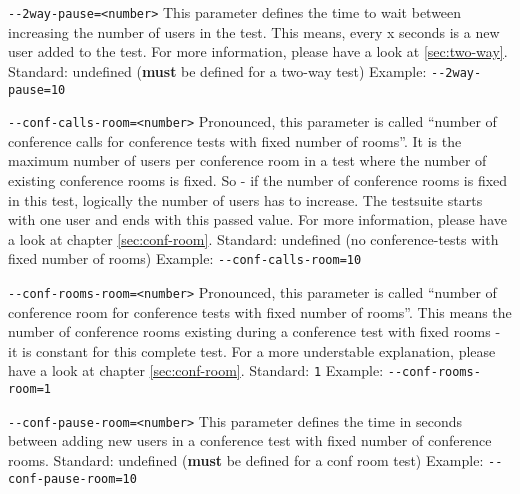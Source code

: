 \begin{description}
\item {\texttt{-{}-2way-pause=<number>}} \newline
This parameter defines the time to wait between increasing the number of users in the test.
This means, every x seconds is a new user added to the test. For more information, please
have a look at \ref{sec:two-way}.
\newline Standard: undefined (\textbf{must} be defined for a two-way test)
\newline Example: \texttt{-{}-2way-pause=10}

\item {\texttt{-{}-conf-calls-room=<number>}} \newline
Pronounced, this parameter is called ``number of conference calls for conference tests
with fixed number of rooms''. It is the maximum number of users per conference room in a test where
the number of existing conference rooms is fixed. So - if the number of conference rooms
is fixed in this test, logically the number of users has to increase. The testsuite starts with
one user and ends with this passed value.
For more information, please have a look at chapter \ref{sec:conf-room}.
\newline Standard: undefined (no conference-tests with fixed number of rooms)
\newline Example: \texttt{-{}-conf-calls-room=10}

\item {\texttt{-{}-conf-rooms-room=<number>}} \newline
Pronounced, this parameter is called ``number of conference room for conference tests with
fixed number of rooms''. This means the number of conference rooms existing during
a conference test with fixed rooms - it is constant for this complete test.
For a more understable explanation, please have a look at chapter \ref{sec:conf-room}.
\newline Standard: \texttt{1}
\newline Example: \texttt{-{}-conf-rooms-room=1}

\item {\texttt{-{}-conf-pause-room=<number>}} \newline
This parameter defines the time in seconds between adding new users in a conference test
with fixed number of conference rooms. 
\newline Standard: undefined (\textbf{must} be defined for a conf room test)
\newline Example: \texttt{-{}-conf-pause-room=10}


\end{description}
